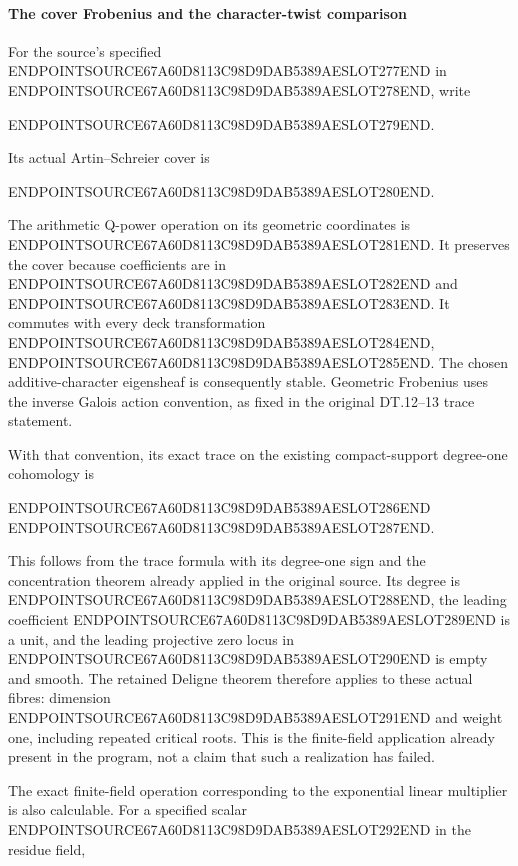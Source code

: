 \paragraph{The cover Frobenius and the character-twist comparison}\label{endpoint-f1_scaling--the-cover-frobenius-and-the-character-twist-comparison}

For the source's specified ENDPOINTSOURCE67A60D8113C98D9DAB5389AESLOT277END in ENDPOINTSOURCE67A60D8113C98D9DAB5389AESLOT278END, write

ENDPOINTSOURCE67A60D8113C98D9DAB5389AESLOT279END.

Its actual Artin--Schreier cover is

ENDPOINTSOURCE67A60D8113C98D9DAB5389AESLOT280END.

The arithmetic Q-power operation on its geometric coordinates is ENDPOINTSOURCE67A60D8113C98D9DAB5389AESLOT281END. It preserves the cover because coefficients are in ENDPOINTSOURCE67A60D8113C98D9DAB5389AESLOT282END and ENDPOINTSOURCE67A60D8113C98D9DAB5389AESLOT283END. It commutes with every deck transformation ENDPOINTSOURCE67A60D8113C98D9DAB5389AESLOT284END, ENDPOINTSOURCE67A60D8113C98D9DAB5389AESLOT285END. The chosen additive-character eigensheaf is consequently stable. Geometric Frobenius uses the inverse Galois action convention, as fixed in the original DT.12--13 trace statement.

With that convention, its exact trace on the existing compact-support degree-one cohomology is

ENDPOINTSOURCE67A60D8113C98D9DAB5389AESLOT286END ENDPOINTSOURCE67A60D8113C98D9DAB5389AESLOT287END.

This follows from the trace formula with its degree-one sign and the concentration theorem already applied in the original source. Its degree is ENDPOINTSOURCE67A60D8113C98D9DAB5389AESLOT288END, the leading coefficient ENDPOINTSOURCE67A60D8113C98D9DAB5389AESLOT289END is a unit, and the leading projective zero locus in ENDPOINTSOURCE67A60D8113C98D9DAB5389AESLOT290END is empty and smooth. The retained Deligne theorem therefore applies to these actual fibres: dimension ENDPOINTSOURCE67A60D8113C98D9DAB5389AESLOT291END and weight one, including repeated critical roots. This is the finite-field application already present in the program, not a claim that such a realization has failed.

The exact finite-field operation corresponding to the exponential linear multiplier is also calculable. For a specified scalar ENDPOINTSOURCE67A60D8113C98D9DAB5389AESLOT292END in the residue field,

